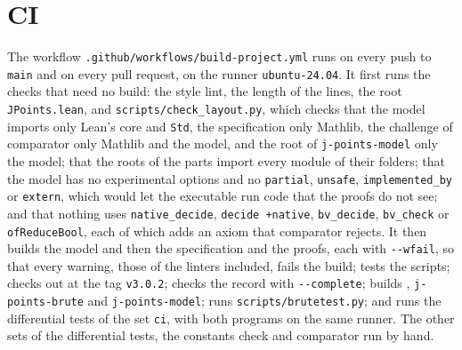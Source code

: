 \section{CI}\label{sec:ccodeCI}

The workflow \verb|.github/workflows/build-project.yml| runs on every push to \verb|main| and on
every pull request, on the runner \verb|ubuntu-24.04|. It first runs the checks that need no build:
the style lint, the length of the lines, the root \verb|JPoints.lean|, and
\verb|scripts/check_layout.py|, which checks that the model imports only Lean's core and \verb|Std|,
the specification only Mathlib, the challenge of comparator only Mathlib and the model, and the root
of \verb|j-points-model| only the model; that the roots of the parts import every module of their
folders; that the model has no experimental options and no \verb|partial|, \verb|unsafe|,
\verb|implemented_by| or \verb|extern|, which would let the executable run code that the proofs do
not see; and that nothing uses \verb|native_decide|, \verb|decide +native|, \verb|bv_decide|,
\verb|bv_check| or \verb|ofReduceBool|, each of which adds an axiom that comparator rejects. It then
builds the model and then the specification and the proofs, each with \verb|--wfail|, so that every
warning, those of the linters included, fails the build; tests the scripts; checks out \jpoints{} at
the tag \verb|v3.0.2|; checks the record with \verb|--complete|; builds \jpoints{},
\verb|j-points-brute| and \verb|j-points-model|; runs \verb|scripts/brutetest.py|; and runs the
differential tests of the set \verb|ci|, with both programs on the same runner. The other sets of
the differential tests, the constants check and comparator run by hand.
